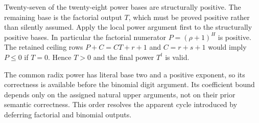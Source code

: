 Twenty-seven of the twenty-eight
power bases are structurally positive.
The remaining base is the factorial
output $T$, which must be proved
positive rather than silently assumed.
Apply the local power argument first
to the structurally positive bases.
In particular the factorial numerator
$P=(\rho+1)^H$ is positive.
The retained ceiling rows
$P+C=CT+r+1$ and $C=r+s+1$
would imply $P\le0$ if $T=0$.
Hence $T>0$ and the final power
$T^t$ is valid.

The common radix power has literal
base two and a positive exponent, so
its correctness is available before
the binomial digit argument.
Its coefficient bound depends only
on the assigned natural upper
arguments, not on their prior
semantic correctness.
This order resolves the apparent
cycle introduced by deferring
factorial and binomial outputs.
